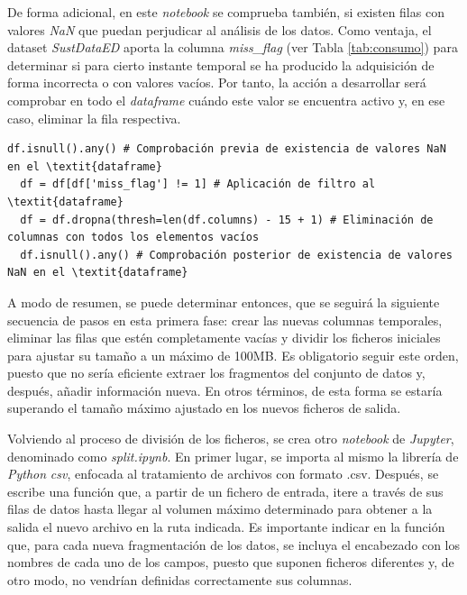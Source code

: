 \vspace{3mm}

De forma adicional, en este \textit{notebook} se comprueba también, si existen filas con valores \textit{NaN} que puedan perjudicar al análisis de los datos. Como ventaja, el dataset \textit{SustDataED} aporta la columna \textit{miss\_flag} (ver Tabla \ref{tab:consumo}) para determinar si para cierto instante temporal se ha producido la adquisición de forma incorrecta o con valores vacíos. Por tanto, la acción a desarrollar será comprobar en todo el \textit{dataframe} cuándo este valor se encuentra activo y, en ese caso, eliminar la fila respectiva.

\vspace{3mm}

\begin{lstlisting}[style=Python, caption={Eliminación de valores NaN}]
  df.isnull().any() # Comprobación previa de existencia de valores NaN en el \textit{dataframe}
  df = df[df['miss_flag'] != 1] # Aplicación de filtro al \textit{dataframe}
  df = df.dropna(thresh=len(df.columns) - 15 + 1) # Eliminación de columnas con todos los elementos vacíos
  df.isnull().any() # Comprobación posterior de existencia de valores NaN en el \textit{dataframe}
\end{lstlisting}

\vspace{3mm}

A modo de resumen, se puede determinar entonces, que se seguirá la siguiente secuencia de pasos en esta primera fase: crear las nuevas columnas temporales, eliminar las filas que estén completamente vacías y dividir los ficheros iniciales para ajustar su tamaño a un máximo de 100MB. Es obligatorio seguir este orden, puesto que no sería eficiente extraer los fragmentos del conjunto de datos y, después, añadir información nueva. En otros términos, de esta forma se estaría superando el tamaño máximo ajustado en los nuevos ficheros de salida.

\vspace{3mm}

Volviendo al proceso de división de los ficheros, se crea otro \textit{notebook} de \textit{Jupyter}, denominado como \textit{split.ipynb}. En primer lugar, se importa al mismo la librería de \textit{Python} \textit{csv}, enfocada al tratamiento de archivos con formato .csv. Después, se escribe una función que, a partir de un fichero de entrada, itere a través de sus filas de datos hasta llegar al volumen máximo determinado para obtener a la salida el nuevo archivo en la ruta indicada. Es importante indicar en la función que, para cada nueva fragmentación de los datos, se incluya el encabezado con los nombres de cada uno de los campos, puesto que suponen ficheros diferentes y, de otro modo, no vendrían definidas correctamente sus columnas.

